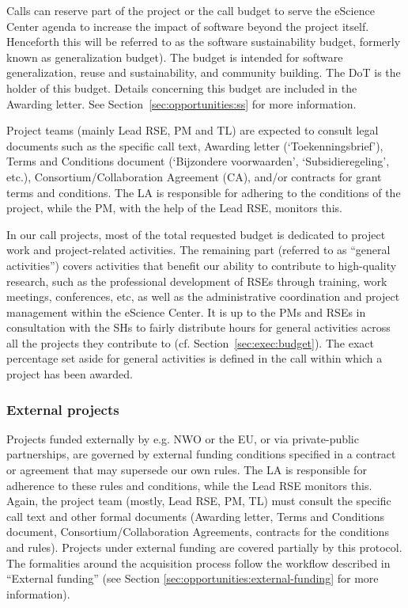 Calls can reserve part of the project or the call budget to serve the eScience Center agenda to increase the impact of
software beyond the project itself. Henceforth this will be referred to as the software sustainability budget, formerly
known as generalization budget). The budget is intended for software generalization, reuse and sustainability, and
community building. The DoT is the holder of this budget. Details concerning this budget are included in the Awarding
letter. See Section~\ref{sec:opportunities:ss} for more information.

Project teams (mainly Lead RSE, PM and TL) are expected to consult legal documents such as the specific call text, Awarding letter
(‘Toekenningsbrief’), Terms and Conditions document (‘Bijzondere voorwaarden’, ‘Subsidieregeling’, etc.), Consortium/Collaboration Agreement (CA), and/or
contracts for grant terms and conditions. The LA is responsible for adhering to the conditions of the project, while
the PM, with the help of the Lead RSE, monitors this.

In our call projects, most of the total requested budget is dedicated to project work and project-related activities.
The remaining part (referred to as “general activities”) covers activities that benefit our ability to contribute to
high-quality research, such as the professional development of RSEs through training, work meetings, conferences, etc,
as well as the administrative coordination and project management within the eScience Center. It is up to the PMs and
RSEs in consultation with the SHs to fairly distribute hours for general activities across all the projects they
contribute to (cf. Section~\ref{sec:exec:budget}). The exact percentage set aside for general activities is defined in
the call within which a project has been awarded.

\subsubsection{External projects}
Projects funded externally by e.g. NWO or the EU, or via private-public partnerships, are governed by external funding
conditions specified in a contract or agreement that may supersede our own rules. %
The LA is responsible for adherence to these rules and conditions, while the Lead RSE monitors this. 
Again, the project team (mostly, Lead RSE, PM, TL) must consult the specific call
text and other formal documents (Awarding letter, Terms and Conditions document, Consortium/Collaboration Agreements, contracts for the conditions
and rules). Projects under external funding are covered partially by this protocol. The formalities around the acquisition process follow the workflow described in “External funding” (see Section
\ref{sec:opportunities:external-funding} for more information).

